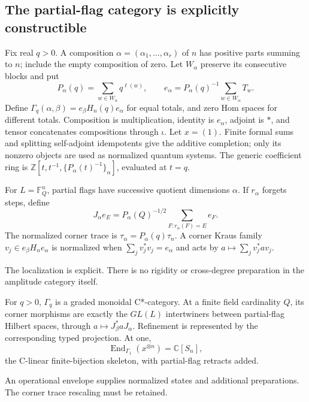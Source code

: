 \subsection{The partial-flag category is explicitly constructible}

\begin{definition}
Fix real $q>0$. A composition $\alpha=(\alpha_1,\ldots,\alpha_r)$ of $n$ has positive
parts summing to $n$; include the empty composition of zero. Let
$W_\alpha$ preserve its consecutive blocks and put
\[
P_\alpha(q)=\sum_{w\in W_\alpha}q^{\ell(w)},\qquad
e_\alpha=P_\alpha(q)^{-1}\sum_{w\in W_\alpha}T_w.
\]
Define $\Gamma_q(\alpha,\beta)=e_\beta H_n(q)e_\alpha$ for equal
totals, and zero Hom spaces for different totals. Composition is
multiplication, identity is $e_\alpha$, adjoint is $*$, and tensor
concatenates compositions through $\iota$. Let $x=(1)$. Finite formal
sums and splitting self-adjoint idempotents give the additive completion;
only its nonzero objects are used as normalized quantum systems.
The generic coefficient ring is
$\mathbb Z[t,t^{-1},\{P_\alpha(t)^{-1}\}_\alpha]$, evaluated at $t=q$.

For $L=\mathbb F_Q^n$, partial flags have successive quotient dimensions
$\alpha$. If $r_\alpha$ forgets steps, define
\[
J_\alpha e_E=P_\alpha(Q)^{-1/2}\sum_{F:r_\alpha(F)=E}e_F.
\]
The normalized corner trace is $\tau_\alpha=P_\alpha(q)\tau_n$.
A corner Kraus family $v_j\in e_\beta H_n e_\alpha$ is normalized when
$\sum_jv_j^*v_j=e_\alpha$ and acts by $a\mapsto\sum_jv_j^*av_j$.
\end{definition}
\begin{scope}The localization is explicit. There is no rigidity or
cross-degree preparation in the amplitude category itself.\end{scope}

\begin{proposition}
{\normalfont\statusSketch}\quad For $q>0$, $\Gamma_q$ is a graded
monoidal C*-category. At a finite field cardinality $Q$, its corner
morphisms are exactly the $GL(L)$ intertwiners between partial-flag
Hilbert spaces, through $a\mapsto J_\beta^*aJ_\alpha$.
Refinement is represented by the corresponding typed projection.
At one,
\[
\operatorname{End}_{\Gamma_1}(x^{\otimes n})=\mathbb C[S_n],
\]
the C-linear finite-bijection skeleton, with partial-flag retracts added.
\end{proposition}
\begin{scope}An operational envelope supplies normalized states and
additional preparations. The corner trace rescaling must be retained.\end{scope}

